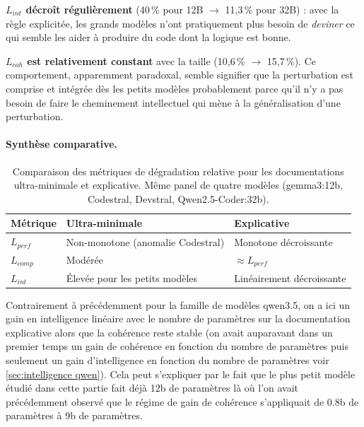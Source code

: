 \documentclass[11pt, a4paper]{article}
\begin{document}
\textbf{$L_{int}$ décroît régulièrement} (40\,\% pour 12B $\to$ 11,3\,\% pour 32B) : avec la règle explicitée, les grands modèles n'ont pratiquement plus besoin de \textit{deviner} ce qui semble les aider à produire du code dont la logique est bonne.

\textbf{$L_{coh}$ est relativement constant} avec la taille (10,6\,\% $\to$ 15,7\,\%). Ce comportement, apparemment paradoxal, semble signifier que la perturbation est comprise et intégrée dès les petits modèles probablement parce qu'il n'y a pas besoin de faire le cheminement intellectuel qui mène à la généralisation d'une perturbation.


\paragraph{Synthèse comparative.}

\begin{table}[htbp]
\centering
\caption{Comparaison des métriques de dégradation relative pour les documentations ultra-minimale et explicative. Même panel de quatre modèles (gemma3:12b, Codestral, Devstral, Qwen2.5-Coder:32b).}
\label{tab:intel_comparison}
\begin{tabular}{l p{5.5cm} p{5.5cm}}
\toprule
\textbf{Métrique} & \textbf{Ultra-minimale} & \textbf{Explicative} \\
\midrule
$L_{perf}$ & Non-monotone (anomalie Codestral) & Monotone décroissante \\
$L_{comp}$ & Modérée                           & $\approx L_{perf}$    \\
$L_{int}$  & Élevée pour les petits modèles    & Linéairement décroissante   \\
\bottomrule
\end{tabular}
\end{table}

Contrairement à précédemment pour la famille de modèles qwen3.5, on a ici un gain en intelligence linéaire avec le nombre de paramètres sur la documentation explicative alors que la cohérence reste stable (on avait auparavant dans un premier temps un gain de cohérence en fonction du nombre de paramètres puis seulement un gain d'intelligence en fonction du nombre de paramètres voir \ref{sec:intelligence qwen}). Cela peut s'expliquer par le fait que le plus petit modèle étudié dans cette partie fait déjà 12b de paramètres là où l'on avait précédemment observé que le régime de gain de cohérence s'appliquait de 0.8b de paramètres à 9b de paramètres.
\end{document}
